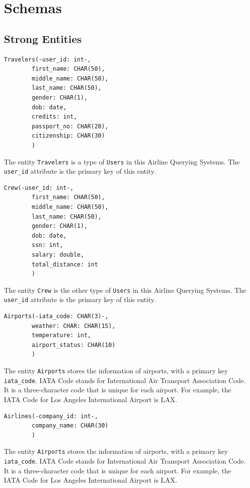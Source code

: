 \documentclass{article}
\begin{document}
	\section{Schemas}
	
	\subsection{Strong Entities}
	\begin{lstlisting}[keepspaces=true]
		Travelers(-user_id: int-,
		first_name: CHAR(50),
		middle_name: CHAR(50),
		last_name: CHAR(50),
		gender: CHAR(1),
		dob: date,
		credits: int,
		passport_no: CHAR(20), 
		citizenship: CHAR(30)
		)
	\end{lstlisting}    
	
	The entity \texttt{Travelers} is a type of \texttt{Users} in this Airline Querying Systems. The 
	\texttt{user\_id} attribute is the primary key of this entity.
	
	\begin{lstlisting}[keepspaces=true]
		Crew(-user_id: int-,
		first_name: CHAR(50),
		middle_name: CHAR(50),
		last_name: CHAR(50),
		gender: CHAR(1),
		dob: date,
		ssn: int, 
		salary: double, 
		total_distance: int
		)
	\end{lstlisting}    
	
	The entity \texttt{Crew} is the other type of \texttt{Users} in this Airline Querying Systems. The 
	\texttt{user\_id} attribute is the primary key of this entity.
	
	\begin{lstlisting}[keepspaces=true]
		Airports(-iata_code: CHAR(3)-, 
		weather: CHAR: CHAR(15),
		temperature: int,
		airport_status: CHAR(10)
		)
	\end{lstlisting}    
	
	The entity \texttt{Airports} stores the information of airports, with a primary key \texttt{iata\_code}. IATA Code stands for International Air Transport Association Code. It is a three-character code that is unique for each airport. For example, the IATA Code for Los Angeles International Airport is LAX.
	
	\begin{lstlisting}[keepspaces=true]             
		Airlines(-company_id: int-,
		company_name: CHAR(30)
		)
	\end{lstlisting}    
	
	The entity \texttt{Airports} stores the information of airports, with a primary key \texttt{iata\_code}. IATA Code stands for International Air Transport Association Code. It is a three-character code that is unique for each airport. For example, the IATA Code for Los Angeles International Airport is LAX.
	
\end{document}
